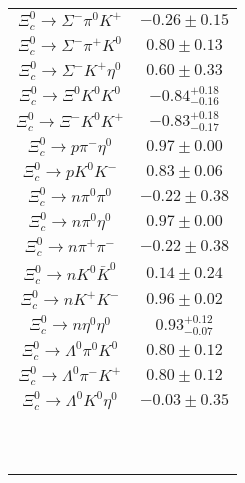 \begin{table}
{\begin{tabular}{|c|c|}
			$\Xi_{c}^{0} \to  \Sigma^{-} \pi^{0} K^{+} $ & $      -0.26 \pm       0.15 $ \\
			$\Xi_{c}^{0} \to  \Sigma^{-} \pi^{+} K^{0} $ & $       0.80 \pm       0.13 $ \\
			$\Xi_{c}^{0} \to  \Sigma^{-} K^{+} \eta^{0} $ & $       0.60 \pm       0.33 $ \\
			$\Xi_{c}^{0} \to  \Xi^{0} K^{0} K^{0} $ & $      -0.84^{ +0.18}_{-0.16} $ \\
			$\Xi_{c}^{0} \to  \Xi^{-} K^{0} K^{+} $ & $      -0.83 ^{+0.18}_{-0.17} $ \\
			$\Xi_{c}^{0} \to  p \pi^{-} \eta^{0} $ & $       0.97 \pm       0.00 $ \\
			$\Xi_{c}^{0} \to  p K^{0} K^{-} $ & $       0.83 \pm       0.06 $ \\
			$\Xi_{c}^{0} \to  n \pi^{0} \pi^{0} $ & $      -0.22 \pm       0.38 $ \\
			$\Xi_{c}^{0} \to  n \pi^{0} \eta^{0} $ & $       0.97 \pm       0.00 $ \\
			$\Xi_{c}^{0} \to  n \pi^{+} \pi^{-} $ & $      -0.22 \pm       0.38 $ \\
			$\Xi_{c}^{0} \to  n K^{0} \bar{K}^{0} $ & $       0.14 \pm       0.24 $ \\
			$\Xi_{c}^{0} \to  n K^{+} K^{-} $ & $       0.96 \pm       0.02 $ \\
			$\Xi_{c}^{0} \to  n \eta^{0} \eta^{0} $ & $       0.93 ^{+ 0.12}_{-0.07} $ \\
			$\Xi_{c}^{0} \to  \Lambda^{0} \pi^{0} K^{0} $ & $       0.80 \pm       0.12 $ \\
			$\Xi_{c}^{0} \to  \Lambda^{0} \pi^{-} K^{+} $ & $       0.80 \pm       0.12 $ \\
			$\Xi_{c}^{0} \to  \Lambda^{0} K^{0} \eta^{0} $ & $      -0.03 \pm       0.35 $ \\
			&\\
			&\\
			&\\
			&\\
			&\\
			&\\
			&\\
			&\\
			&\\
			&\\
			\hline
		\end{tabular}
	}
\end{table}
